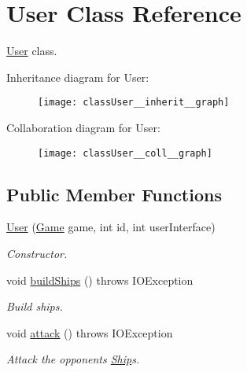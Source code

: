 \hypertarget{classUser}{}\section{User Class Reference}
\label{classUser}


\hyperlink{classUser}{User} class.  




Inheritance diagram for User\+:
\nopagebreak
\begin{figure}[H]
\begin{center}
\leavevmode
\texttt{[image: classUser\_\_inherit\_\_graph]}
\end{center}
\end{figure}


Collaboration diagram for User\+:
\nopagebreak
\begin{figure}[H]
\begin{center}
\leavevmode
\texttt{[image: classUser\_\_coll\_\_graph]}
\end{center}
\end{figure}
\subsection*{Public Member Functions}
\begin{DoxyCompactItemize}
\item 
\hyperlink{classUser_a7f5bdedd380237069e06d050569b9af1}{User} (\hyperlink{classGame}{Game} game, int id, int user\+Interface)
\begin{DoxyCompactList}\small\item\em Constructor. \end{DoxyCompactList}\item 
void \hyperlink{classUser_a29bbf7266caac4aae7aa26acf1f19592}{build\+Ships} ()  throws I\+O\+Exception 
\begin{DoxyCompactList}\small\item\em Build ships. \end{DoxyCompactList}\item 
void \hyperlink{classUser_a55aa9603904b16a22b91a357a32333ff}{attack} ()  throws I\+O\+Exception \hypertarget{classUser_a55aa9603904b16a22b91a357a32333ff}{}\label{classUser_a55aa9603904b16a22b91a357a32333ff}

\begin{DoxyCompactList}\small\item\em Attack the opponent\textquotesingle{}s \hyperlink{classShip}{Ship}\textquotesingle{}s. \end{DoxyCompactList}\end{DoxyCompactItemize}


